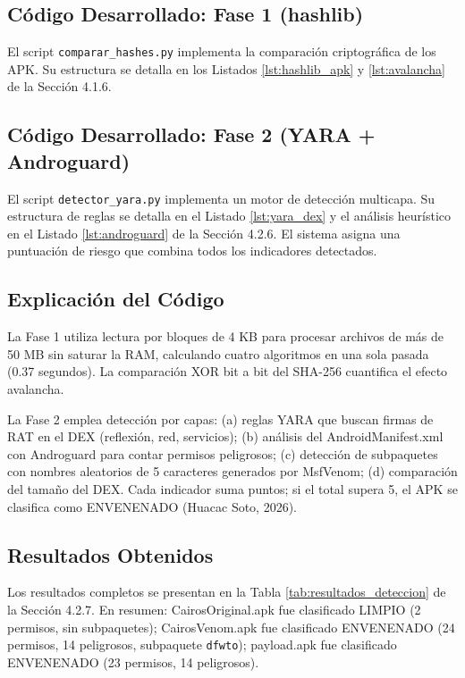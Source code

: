 \documentclass[12pt,a4paper]{article}
\begin{document}
\subsection{Código Desarrollado: Fase 1 (hashlib)}

El script \texttt{comparar\_hashes.py} implementa la comparación
criptográfica de los APK. Su estructura se detalla en los Listados
\ref{lst:hashlib_apk} y \ref{lst:avalancha} de la Sección 4.1.6.

\subsection{Código Desarrollado: Fase 2 (YARA + Androguard)}

El script \texttt{detector\_yara.py} implementa un motor de detección
multicapa. Su estructura de reglas se detalla en el Listado
\ref{lst:yara_dex} y el análisis heurístico en el Listado
\ref{lst:androguard} de la Sección 4.2.6. El sistema asigna una
puntuación de riesgo que combina todos los indicadores detectados.

\subsection{Explicación del Código}

La Fase 1 utiliza lectura por bloques de 4 KB para procesar archivos de
más de 50 MB sin saturar la RAM, calculando cuatro algoritmos en una
sola pasada (0.37 segundos). La comparación XOR bit a bit del SHA-256
cuantifica el efecto avalancha.

La Fase 2 emplea detección por capas: (a) reglas YARA que buscan firmas
de RAT en el DEX (reflexión, red, servicios); (b) análisis del
AndroidManifest.xml con Androguard para contar permisos peligrosos; (c)
detección de subpaquetes con nombres aleatorios de 5 caracteres
generados por MsfVenom; (d) comparación del tamaño del DEX. Cada
indicador suma puntos; si el total supera 5, el APK se clasifica como
ENVENENADO (Huacac Soto, 2026).

\subsection{Resultados Obtenidos}

Los resultados completos se presentan en la Tabla
\ref{tab:resultados_deteccion} de la Sección 4.2.7. En resumen:
CairosOriginal.apk fue clasificado LIMPIO (2 permisos, sin subpaquetes);
CairosVenom.apk fue clasificado ENVENENADO (24 permisos, 14 peligrosos,
subpaquete \texttt{dfwto}); payload.apk fue clasificado ENVENENADO (23
permisos, 14 peligrosos).
\end{document}
